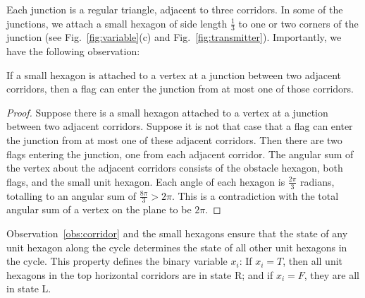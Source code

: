 Each junction is a regular triangle, adjacent to three corridors. 
In some of the junctions, we attach a small hexagon of side length $\frac{1}{3}$ to one or two corners of the junction (see Fig.~\ref{fig:variable}(c) and Fig.~\ref{fig:transmitter}). 
Importantly, we have the following observation:
\begin{observation}\label{obs:junction}
If a small hexagon is attached to a vertex at a junction between two adjacent corridors, then a flag can enter the junction from at most one of those corridors.
\end{observation}
\begin{proof}
Suppose there is a small hexagon attached to a vertex at a junction between two adjacent corridors.
Suppose it is not that case that a flag can enter the junction from at most one of these adjacent corridors.
Then there are two flags entering the junction, one from each adjacent corridor.
The angular sum of the vertex about the adjacent corridors consists of the obstacle hexagon, both flags, and the small unit hexagon.
Each angle of each hexagon is $\frac{2 \pi}{3}$ radians, totalling to an angular sum of $\frac{8 \pi}{3} > 2 \pi$.
This is a contradiction with the total angular sum of a vertex on the plane to be $2 \pi$.
\end{proof}

Observation~\ref{obs:corridor} and the small hexagons ensure that the state of any unit hexagon along the cycle determines the state of all other unit hexagons in the cycle. 
This property defines the binary variable $x_i$: If $x_i=T$, then all unit hexagons in the top horizontal corridors are in state R; and if $x_i=F$, they are all in state L.

